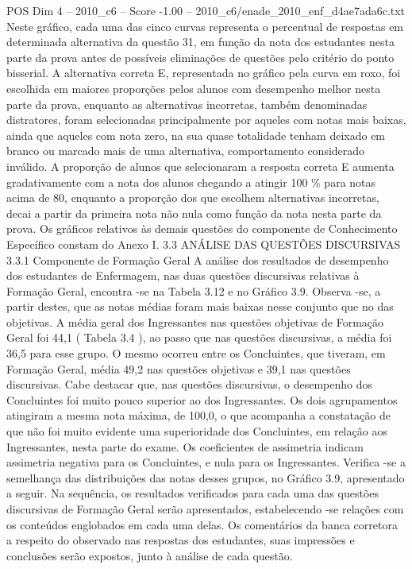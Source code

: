 \begin{textsample}{POS Dim 4 – 2010\_c6 – Score -1.00 – 2010\_c6/enade\_2010\_enf\_d4ae7ada6c.txt}
Neste gráfico, cada uma das cinco curvas representa o percentual de respostas em determinada alternativa da questão 31, em função da nota dos estudantes nesta parte da prova antes de possíveis eliminações de questões pelo critério do ponto bisserial.
A alternativa correta E, representada no gráfico pela curva em roxo, foi escolhida em maiores proporções pelos alunos com desempenho melhor nesta parte da prova, enquanto as alternativas incorretas, também denominadas distratores, foram selecionadas principalmente por aqueles com notas mais baixas, ainda que aqueles com nota zero, na sua quase totalidade tenham deixado em branco ou marcado mais de uma alternativa, comportamento considerado inválido.
A proporção de alunos que selecionaram a resposta correta E aumenta gradativamente com a nota dos alunos chegando a atingir 100 \% para notas acima de 80, enquanto a proporção dos que escolhem alternativas incorretas, decai a partir da primeira nota não nula como função da nota nesta parte da prova.
Os gráficos relativos às demais questões do componente de Conhecimento Específico constam do Anexo I. 3.3 ANÁLISE DAS QUESTÕES DISCURSIVAS 3.3.1 Componente de Formação Geral A análise dos resultados de desempenho dos estudantes de Enfermagem, nas duas questões discursivas relativas à Formação Geral, encontra -se na Tabela 3.12 e no Gráfico 3.9.
Observa -se, a partir destes, que as notas médias foram mais baixas nesse conjunto que no das objetivas.
A média geral dos Ingressantes nas questões objetivas de Formação Geral foi 44,1 ( Tabela 3.4 ), ao passo que nas questões discursivas, a média foi 36,5 para esse grupo.
O mesmo ocorreu entre os Concluintes, que tiveram, em Formação Geral, média 49,2 nas questões objetivas e 39,1 nas questões discursivas.
Cabe destacar que, nas questões discursivas, o desempenho dos Concluintes foi muito pouco superior ao dos Ingressantes.
Os dois agrupamentos atingiram a mesma nota máxima, de 100,0, o que acompanha a constatação de que não foi muito evidente uma superioridade dos Concluintes, em relação aos Ingressantes, nesta parte do exame.
Os coeficientes de assimetria indicam assimetria negativa para os Concluintes, e nula para os Ingressantes.
Verifica -se a semelhança das distribuições das notas desses grupos, no Gráfico 3.9, apresentado a seguir.
Na sequência, os resultados verificados para cada uma das questões discursivas de Formação Geral serão apresentados, estabelecendo -se relações com os conteúdos englobados em cada uma delas.
Os comentários da banca corretora a respeito do observado nas respostas dos estudantes, suas impressões e conclusões serão expostos, junto à análise de cada questão.

\end{textsample}
